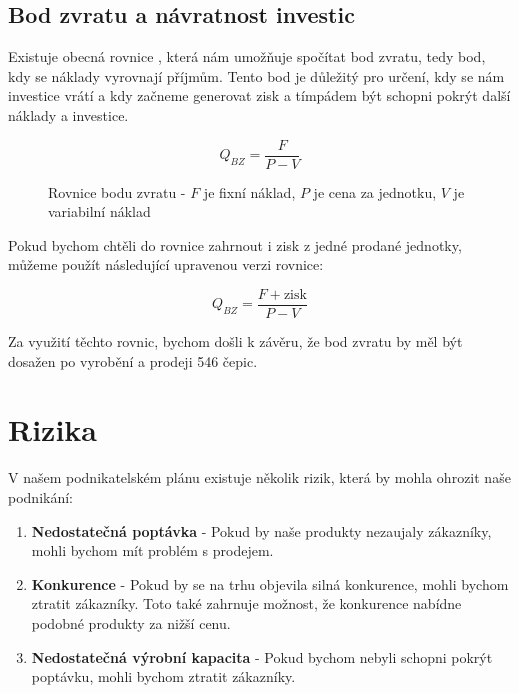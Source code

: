 \documentclass[12pt, a4paper]{article}
\begin{document}
\subsection{Bod zvratu a návratnost investic}

Existuje obecná rovnice \cite{bod-zvratu}, která nám umožňuje spočítat bod zvratu, tedy bod, kdy se náklady vyrovnají příjmům.
Tento bod je důležitý pro určení, kdy se nám investice vrátí a kdy začneme generovat zisk a tímpádem
být schopni pokrýt další náklady a investice.

\begin{figure}[h!]
  \centering
  \captionsetup{justification=centering}
  \begin{equation}
    Q_{BZ}=\frac{F}{P-V}
  \end{equation}
  \caption{Rovnice bodu zvratu - $F$ je fixní náklad, $P$ je cena za jednotku, $V$ je variabilní náklad}
\end{figure}

\pagebreak

\noindent Pokud bychom chtěli do rovnice zahrnout i zisk z jedné prodané jednotky, můžeme použít následující upravenou verzi rovnice:

\begin{figure}[h!]
  \centering
  \captionsetup{justification=centering}
  \begin{equation}
    Q_{BZ}=\frac{F+\text{zisk}}{P-V}
  \end{equation}
\end{figure}

\noindent Za využití těchto rovnic, bychom došli k závěru, že bod zvratu by měl být dosažen po vyrobění
a prodeji 546 čepic.

\section{Rizika}

V našem podnikatelském plánu existuje několik rizik, která by mohla ohrozit naše podnikání:

\begin{enumerate}
  \item \textbf{Nedostatečná poptávka} - Pokud by naše produkty nezaujaly zákazníky, mohli bychom mít problém s prodejem.
  \item \textbf{Konkurence} - Pokud by se na trhu objevila silná konkurence, mohli bychom ztratit zákazníky.
  Toto také zahrnuje možnost, že konkurence nabídne podobné produkty za nižší cenu.
  \item \textbf{Nedostatečná výrobní kapacita} - Pokud bychom nebyli schopni pokrýt poptávku, mohli bychom ztratit zákazníky.
\end{enumerate}
\end{document}
